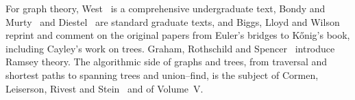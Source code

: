 For graph theory, West~\cite{west2001} is a comprehensive undergraduate text, Bondy and Murty~\cite{bondymurty2008} and Diestel~\cite{diestel2017} are standard graduate texts, and Biggs, Lloyd and Wilson~\cite{biggs1976} reprint and comment on the original papers from Euler's bridges to K\H{o}nig's book, including Cayley's work on trees. Graham, Rothschild and Spencer~\cite{graham1990ramsey} introduce Ramsey theory. The algorithmic side of graphs and trees, from traversal and shortest paths to spanning trees and union--find, is the subject of Cormen, Leiserson, Rivest and Stein~\cite{cormen2022} and of Volume~V.

\chapterreferences

